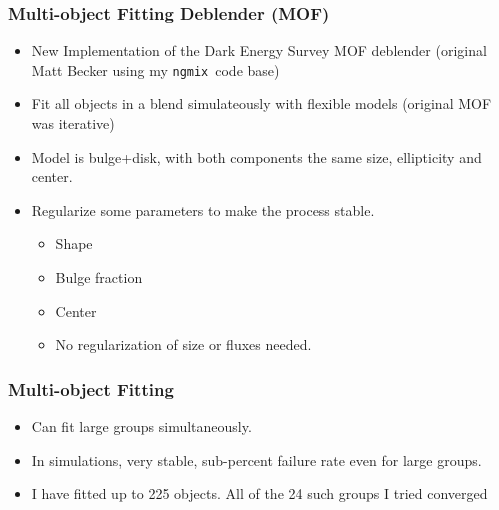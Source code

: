 \documentclass{beamer}
\newcommand{\ngmix}{\texttt{ngmix}}
\begin{document}
\frame
{
    \frametitle{Multi-object Fitting Deblender (MOF)}

    \begin{itemize}

        \item New Implementation of the Dark Energy Survey MOF deblender
            (original Matt Becker using my \ngmix\ code base)

        \item Fit all objects in a blend simulateously
            with flexible models (original MOF was iterative)

        \item Model is bulge+disk, with both components
            the same size, ellipticity and center.

        \item Regularize some parameters to make the process stable.
            \begin{itemize}
                \item Shape
                \item Bulge fraction
                \item Center
                \item No regularization of size or fluxes needed.
            \end{itemize}

    \end{itemize}

}

\frame
{
    \frametitle{Multi-object Fitting}

    \begin{itemize}
            
        \item Can fit large groups simultaneously.

        \item In simulations, very stable, sub-percent failure rate even for
            large groups.

        \item I have fitted up to 225 objects. All of the 24 such groups I
            tried converged

    \end{itemize}

}
\end{document}
